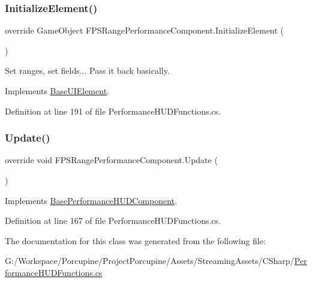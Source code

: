 \subsubsection{\texorpdfstring{Initialize\+Element()}{InitializeElement()}}
{\footnotesize\ttfamily override Game\+Object F\+P\+S\+Range\+Performance\+Component.\+Initialize\+Element (\begin{DoxyParamCaption}{ }\end{DoxyParamCaption})\hspace{0.3cm}{\ttfamily [virtual]}}



Set ranges, set fields... Pass it back basically. 



Implements \hyperlink{class_base_u_i_element_a9a0aa6ac0b194f90e092b372adce4e30}{Base\+U\+I\+Element}.



Definition at line 191 of file Performance\+H\+U\+D\+Functions.\+cs.

\mbox{\label{class_f_p_s_range_performance_component_aa556fcde95018c2a43f0e54f746c7980}} 
\subsubsection{\texorpdfstring{Update()}{Update()}}
{\footnotesize\ttfamily override void F\+P\+S\+Range\+Performance\+Component.\+Update (\begin{DoxyParamCaption}{ }\end{DoxyParamCaption})\hspace{0.3cm}{\ttfamily [virtual]}}



Implements \hyperlink{class_base_performance_h_u_d_component_a7a585b4c22bd5b3daee51bf126fa1cec}{Base\+Performance\+H\+U\+D\+Component}.



Definition at line 167 of file Performance\+H\+U\+D\+Functions.\+cs.



The documentation for this class was generated from the following file\+:\begin{DoxyCompactItemize}
\item 
G\+:/\+Workspace/\+Porcupine/\+Project\+Porcupine/\+Assets/\+Streaming\+Assets/\+C\+Sharp/\hyperlink{_performance_h_u_d_functions_8cs}{Performance\+H\+U\+D\+Functions.\+cs}\end{DoxyCompactItemize}
